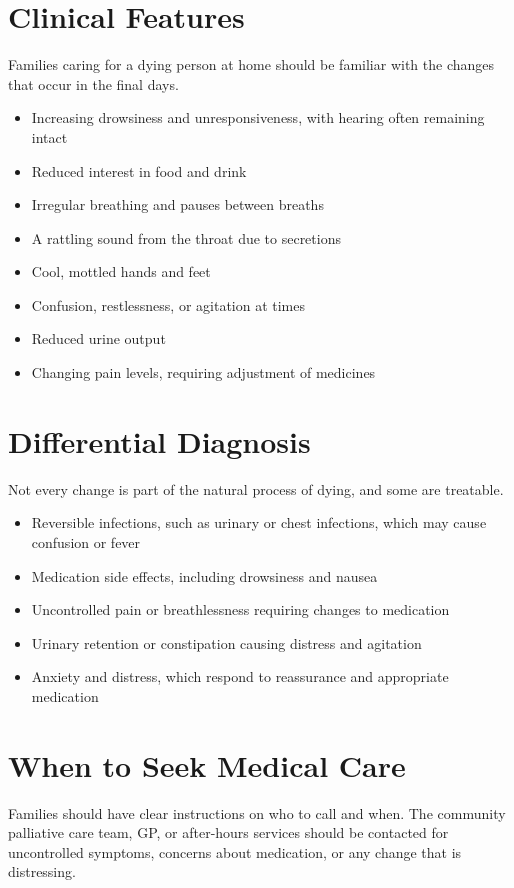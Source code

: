 \section*{Clinical Features}
Families caring for a dying person at home should be familiar with the changes that occur in the final days.
\begin{itemize}
    \item Increasing drowsiness and unresponsiveness, with hearing often remaining intact
    \item Reduced interest in food and drink
    \item Irregular breathing and pauses between breaths
    \item A rattling sound from the throat due to secretions
    \item Cool, mottled hands and feet
    \item Confusion, restlessness, or agitation at times
    \item Reduced urine output
    \item Changing pain levels, requiring adjustment of medicines
\end{itemize}

\section*{Differential Diagnosis}
Not every change is part of the natural process of dying, and some are treatable.
\begin{itemize}
    \item Reversible infections, such as urinary or chest infections, which may cause confusion or fever
    \item Medication side effects, including drowsiness and nausea
    \item Uncontrolled pain or breathlessness requiring changes to medication
    \item Urinary retention or constipation causing distress and agitation
    \item Anxiety and distress, which respond to reassurance and appropriate medication
\end{itemize}

\section*{When to Seek Medical Care}
Families should have clear instructions on who to call and when. The community palliative care team, GP, or after-hours services should be contacted for uncontrolled symptoms, concerns about medication, or any change that is distressing.

